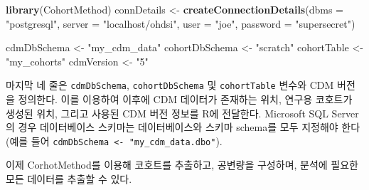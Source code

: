 \documentclass[10.5pt]{book}
\newenvironment{Shaded}{\begin{snugshade}}{\end{snugshade}}
\newcommand{\KeywordTok}[1]{\textcolor[rgb]{0.13,0.29,0.53}{\textbf{#1}}}
\newcommand{\DataTypeTok}[1]{\textcolor[rgb]{0.13,0.29,0.53}{#1}}
\newcommand{\StringTok}[1]{\textcolor[rgb]{0.31,0.60,0.02}{#1}}
\newcommand{\NormalTok}[1]{#1}
\theoremstyle{definition}
\theoremstyle{definition}
\theoremstyle{definition}
\theoremstyle{remark}
\begin{document}
\begin{Shaded}
\begin{Highlighting}[]
\KeywordTok{library}\NormalTok{(CohortMethod)}
\NormalTok{connDetails <-}\StringTok{ }\KeywordTok{createConnectionDetails}\NormalTok{(}\DataTypeTok{dbms =} \StringTok{"postgresql"}\NormalTok{,}
                                       \DataTypeTok{server =} \StringTok{"localhost/ohdsi"}\NormalTok{,}
                                       \DataTypeTok{user =} \StringTok{"joe"}\NormalTok{,}
                                       \DataTypeTok{password =} \StringTok{"supersecret"}\NormalTok{)}

\NormalTok{cdmDbSchema <-}\StringTok{ "my_cdm_data"}
\NormalTok{cohortDbSchema <-}\StringTok{ "scratch"}
\NormalTok{cohortTable <-}\StringTok{ "my_cohorts"}
\NormalTok{cdmVersion <-}\StringTok{ "5"}
\end{Highlighting}
\end{Shaded}

마지막 네 줄은 \texttt{cdmDbSchema}, \texttt{cohortDbSchema} 및
\texttt{cohortTable} 변수와 CDM 버전을 정의한다. 이를 이용하여 이후에
CDM 데이터가 존재하는 위치, 연구용 코호트가 생성된 위치, 그리고 사용된
CDM 버전 정보를 R에 전달한다. Microsoft SQL Server의 경우 데이터베이스
스키마는 데이터베이스와 스키마 schema를 모두 지정해야 한다 (예를 들어
\texttt{cdmDbSchema\ \textless{}-\ "my\_cdm\_data.dbo"}).

이제 CorhotMethod를 이용해 코호트를 추출하고, 공변량을 구성하며, 분석에
필요한 모든 데이터를 추출할 수 있다.
\end{document}
